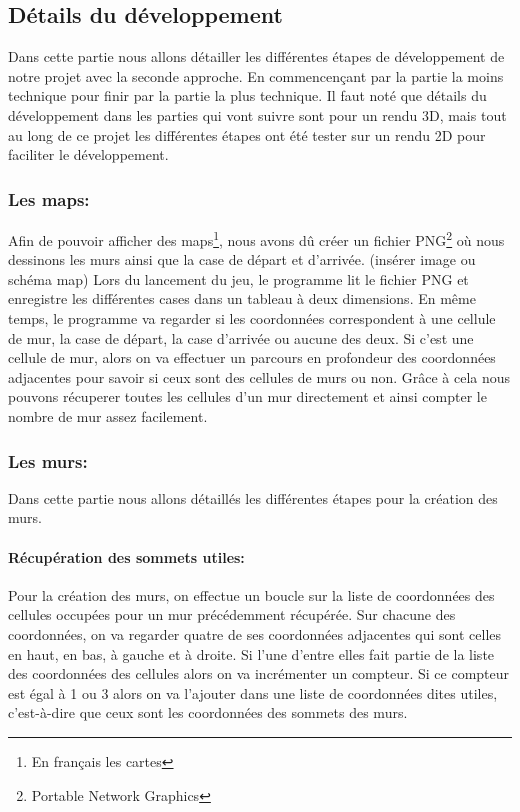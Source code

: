 \documentclass[12pt]{report}
\begin{document}
\subsection{Détails du développement}
Dans cette partie nous allons détailler les différentes étapes de développement de notre projet avec la seconde approche. En commencençant par la partie la moins technique pour finir par la partie la plus technique. Il faut noté que détails du développement dans les parties qui vont suivre sont pour un rendu 3D, mais tout au long de ce projet les différentes étapes ont été tester sur un rendu 2D pour faciliter le développement.

\subsubsection{Les maps:}
Afin de pouvoir afficher des maps\footnote{En français les cartes}, nous avons dû créer un fichier PNG\footnote{Portable Network Graphics} où nous dessinons les murs ainsi que la case de départ et d'arrivée. (insérer image ou schéma map) Lors du lancement du jeu, le programme lit le fichier PNG et enregistre les différentes cases dans un tableau à deux dimensions. En même temps, le programme va regarder si les coordonnées correspondent à une cellule de mur, la case de départ, la case d'arrivée ou aucune des deux. Si c'est une cellule de mur, alors on va effectuer un parcours en profondeur des coordonnées adjacentes pour savoir si ceux sont des cellules de murs ou non. Grâce à cela nous pouvons récuperer toutes les cellules d'un mur directement et ainsi compter le nombre de mur assez facilement.

\subsubsection{Les murs:}

Dans cette partie nous allons détaillés les différentes étapes pour la création des murs.

\paragraph{Récupération des sommets utiles:}

Pour la création des murs, on effectue un boucle sur la liste de coordonnées des cellules occupées pour un mur précédemment récupérée. Sur chacune des coordonnées, on va regarder quatre de ses coordonnées adjacentes qui sont celles en haut, en bas, à gauche et à droite. Si l'une d'entre elles fait partie de la liste des coordonnées des cellules alors on va incrémenter un compteur. Si ce compteur est égal à 1 ou 3 alors on va l'ajouter dans une liste de coordonnées dites utiles, c'est-à-dire que ceux sont les coordonnées des sommets des murs.
\end{document}

